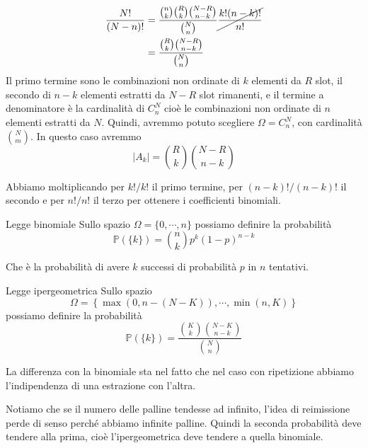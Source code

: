 \documentclass[a4paper]{article}
\begin{document}
\begin{snippetsolution}{}
\begin{enumerate}
\begin{align*}
{                    \frac{N!}{(N-n)!}
                }
                &= \frac{\binom{n}{k}
                \binom{R}{k}\binom{N-R}{n-k}}{
                    \binom{N}{n}
                } \cancel{
                    \frac{k!(n-k)!}{n!}
                } \\
                &= \frac{
                    \binom{R}{k}\binom{N-R}{n-k}
                }{
                    \binom{N}{n}
                }
            \end{align*}
            Il primo termine sono le combinazioni non ordinate di \(k\)
            elementi da \(R\) slot, il secondo di \(n-k\) elementi estratti da \(N-R\) slot
            rimanenti, e il termine a denominatore è la cardinalità di \(C_n^N\)
            cioè le combinazioni non ordinate di \(n\) elementi estratti da \(N\).
            Quindi, avremmo potuto scegliere \(\Omega = C_n^N\), con cardinalità
            \(\binom{N}{m}\).
            In questo caso avremmo
            \[
                |A_k| = \binom{R}{k} \binom{N-R}{n-k}
            \]
    \end{enumerate}
    Abbiamo moltiplicando per \(k!/k!\) il primo termine, per \((n-k)!/(n-k)!\) il secondo
    e per \(n!/n!\) il terzo per ottenere i coefficienti binomiali.
\end{snippetsolution}

\pagebreak

\begin{snippetdefinition}{Legge binomiale}
    Sullo spazio \(\Omega = \{0, \cdots, n\}\) possiamo definire la probabilità
    \[
        \mathbb P(\{k\}) = \binom{n}{k} p^k (1-p)^{n-k}
    \]
\end{snippetdefinition}

Che è la probabilità di avere \(k\) successi di probabilità \(p\) in \(n\) tentativi.

\begin{snippetdefinition}{Legge ipergeometrica}
    Sullo spazio
    \[
        \Omega = \left\{ \max(0, n-(N-K)), \cdots, \min(n,K) \right\}
    \]
    possiamo definire la probabilità
    \[
        \mathbb P(\{k\})
        =
        \frac{\binom{K}{k}\binom{N-K}{n-k}}{\binom{N}{n}}
    \]
\end{snippetdefinition}

La differenza con la binomiale sta nel fatto che
nel caso con ripetizione abbiamo l'indipendenza
di una estrazione con l'altra.

Notiamo che se il numero delle palline tendesse ad infinito,
l'idea di reimissione perde di senso perché abbiamo infinite palline.
Quindi la seconda probabilità deve tendere alla prima, cioè l'ipergeometrica
deve tendere a quella binomiale.
\end{document}

